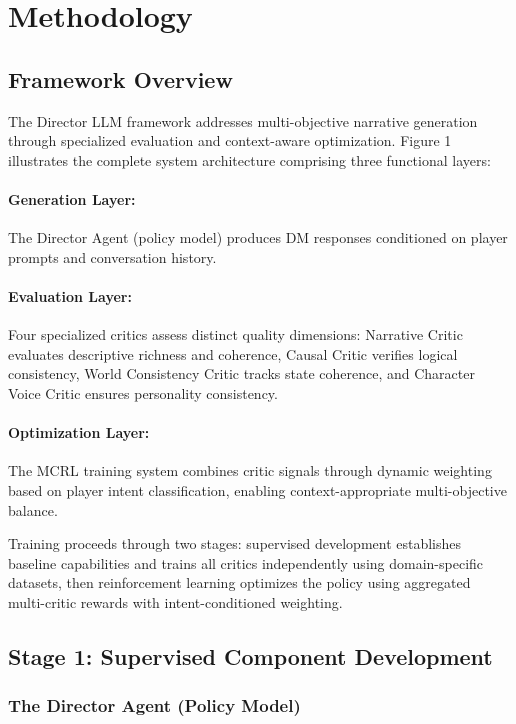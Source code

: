 \documentclass[11pt]{article}
\begin{document}
\section{Methodology}

\subsection{Framework Overview}

The Director LLM framework addresses multi-objective narrative generation through specialized evaluation and context-aware optimization. Figure 1 illustrates the complete system architecture comprising three functional layers:

\paragraph{Generation Layer:} The Director Agent (policy model) produces DM responses conditioned on player prompts and conversation history.

\paragraph{Evaluation Layer:} Four specialized critics assess distinct quality dimensions: Narrative Critic evaluates descriptive richness and coherence, Causal Critic verifies logical consistency, World Consistency Critic tracks state coherence, and Character Voice Critic ensures personality consistency.

\paragraph{Optimization Layer:} The MCRL training system combines critic signals through dynamic weighting based on player intent classification, enabling context-appropriate multi-objective balance.

Training proceeds through two stages: supervised development establishes baseline capabilities and trains all critics independently using domain-specific datasets, then reinforcement learning optimizes the policy using aggregated multi-critic rewards with intent-conditioned weighting.

\subsection{Stage 1: Supervised Component Development}

\subsubsection{The Director Agent (Policy Model)}
\end{document}
